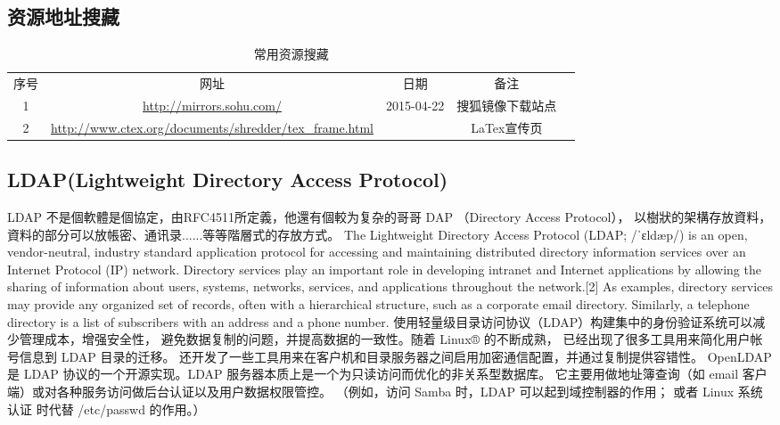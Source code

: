\documentclass{book}
\begin{document}
\subsection{资源地址搜藏}

\begin{longtable}{|c|c|c|c|c|}
	\caption{常用资源搜藏}\\
	\hline
	\multirow{1}{*}{序号}
	& \multicolumn{1}{c|}{网址}  
	& \multicolumn{1}{c|}{日期} 
	& \multicolumn{1}{c|}{备注}\\			
	\cline{1-4}
	1 & \url{http://mirrors.sohu.com/} & 2015-04-22 & 搜狐镜像下载站点\\
	\hline
	2 & \url{http://www.ctex.org/documents/shredder/tex_frame.html} & & LaTex宣传页\\
	\hline
\end{longtable}

\subsection{LDAP(Lightweight Directory Access Protocol)}

LDAP 不是個軟體是個協定，由RFC4511所定義，他還有個較为复杂的哥哥 DAP （Directory Access Protocol），
以樹狀的架構存放資料，資料的部分可以放帳密、通讯录......等等階層式的存放方式。
The Lightweight Directory Access Protocol (LDAP; /ˈɛldæp/) is an open, 
vendor-neutral, industry standard application protocol for accessing and 
maintaining distributed directory information services over an Internet Protocol (IP) network.
Directory services play an important role in developing intranet and Internet applications by allowing the sharing of information about users, 
systems, networks, services, and applications throughout the network.[2] As examples, 
directory services may provide any organized set of records, often with a hierarchical structure, 
such as a corporate email directory. Similarly, a telephone directory is a list of subscribers with an address and a phone number.
使用轻量级目录访问协议（LDAP）构建集中的身份验证系统可以减少管理成本，增强安全性，
避免数据复制的问题，并提高数据的一致性。随着 Linux® 的不断成熟，
已经出现了很多工具用来简化用户帐号信息到 LDAP 目录的迁移。
还开发了一些工具用来在客户机和目录服务器之间启用加密通信配置，并通过复制提供容错性。
OpenLDAP 是 LDAP 协议的一个开源实现。LDAP 服务器本质上是一个为只读访问而优化的非关系型数据库。
它主要用做地址簿查询（如 email 客户端）或对各种服务访问做后台认证以及用户数据权限管控。
（例如，访问 Samba 时，LDAP 可以起到域控制器的作用；
或者 Linux 系统认证 时代替 /etc/passwd 的作用。）
\end{document}
